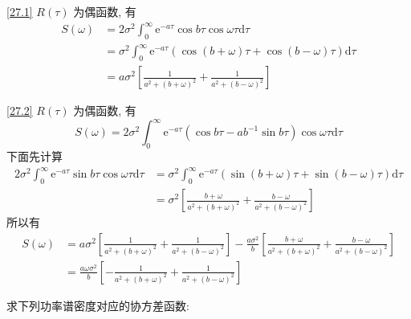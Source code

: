 \documentclass[boxes]{homework}
\begin{document}
\begin{solution}
    \ref{27.1} $R(\tau)$ 为偶函数, 有
    \begin{equation}
        \begin{aligned}
            S(\omega) & = 2\sigma^2\int_0^\infty \mathrm{e}^{-a\tau}\cos b \tau\cos\omega\tau\mathrm{d}\tau                                  \\
                      & = \sigma^2 \int_0^\infty \mathrm{e}^{-a\tau}\left(\cos (b + \omega)\tau + \cos (b - \omega)\tau\right)\mathrm{d}\tau \\
                      & = a\sigma^2 \left[\frac{1}{a^2 + (b + \omega)^2} + \frac{1}{a^2 + (b - \omega)^2}\right]
        \end{aligned}
    \end{equation}

    \ref{27.2} $R(\tau)$ 为偶函数, 有
    \begin{equation}
        S(\omega) = 2\sigma^2\int_0^\infty \mathrm{e}^{-a\tau}(\cos b\tau - a b^{-1} \sin b\tau)\cos\omega\tau\mathrm{d}\tau
    \end{equation}
    下面先计算
    \begin{equation}
        \begin{aligned}
            2\sigma^2\int_0^\infty \mathrm{e}^{-a\tau}\sin b\tau\cos\omega\tau\mathrm{d}\tau
             & = \sigma^2\int_0^\infty \mathrm{e}^{-a\tau}(\sin (b+\omega)\tau+\sin (b-\omega)\tau)\mathrm{d}\tau \\
             & = \sigma^2\left[\frac{b+\omega}{a^2+(b+\omega)^2} + \frac{b-\omega}{a^2+(b-\omega)^2}\right]
        \end{aligned}
    \end{equation}
    所以有
    \begin{equation}
        \begin{aligned}
            S(\omega) & = a\sigma^2 \left[\frac{1}{a^2 + (b + \omega)^2} + \frac{1}{a^2 + (b - \omega)^2}\right]
            - \frac{a\sigma^2}{b}\left[\frac{b+\omega}{a^2+(b+\omega)^2} + \frac{b-\omega}{a^2+(b-\omega)^2}\right]       \\
                      & = \frac{a\omega\sigma^2}{b}\left[- \frac{1}{a^2+(b+\omega)^2} + \frac{1}{a^2+(b-\omega)^2}\right]
        \end{aligned}
    \end{equation}
\end{solution}
\begin{problem}
求下列功率谱密度对应的协方差函数:
\end{problem}
\end{document}
